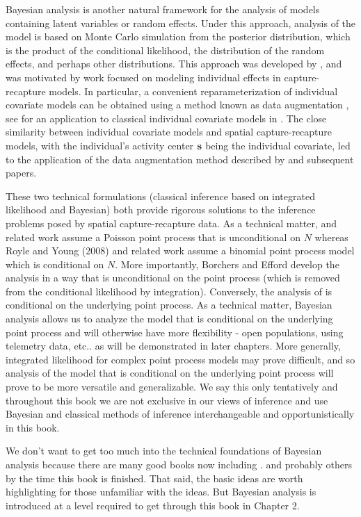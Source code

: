 Bayesian analysis is another natural framework for the analysis of
models containing latent variables or random effects.  Under this
approach, analysis of the model is based on Monte Carlo simulation
from the posterior distribution, which is the product of the
conditional likelihood, the distribution of the random effects, and
perhaps other distributions.  This approach was developed by
\citet{royle_young:2008}, and was motivated by work focused on
modeling individual effects in capture-recapture models. In
particular, a convenient reparameterization of individual covariate
models can be obtained using a method known as data augmentation
\citep{royle_etal:2007}, see \citet{royle:2008} for an application to
classical individual covariate models in \citet{royle:2008}. The close
similarity between individual covariate models and spatial
capture-recapture models, with the individual's activity center ${\bf
  s}$ being the individual covariate, led to the application of the
data augmentation method described by \citet{royle_young:2008} and subsequent papers. 

These two technical formulations (classical inference based on
integrated likelihood and Bayesian) both provide rigorous solutions to
the inference problems posed by spatial capture-recapture data.  As a
technical matter, \citet{borchers_efford:2008} and related work assume
a Poisson point process that is unconditional on $N$ whereas Royle and
Young (2008) and related work assume a binomial point process model
which is conditional on $N$.  More importantly, Borchers and Efford
develop the analysis in a way that is unconditional on the point
process (which is removed from the conditional likelihood by
integration).  Conversely, the analysis of \citet{royle_young:2008} is
conditional on the underlying point process. As a technical matter,
Bayesian analysis allows us to analyze the model that is conditional
on the underlying point process and will otherwise have more
flexibility - open populations, using telemetry data, etc.. as will be
demonstrated in later chapters.  More generally, integrated likelihood
for complex point process models may prove difficult, and so analysis
of the model that is conditional on the underlying point process will
prove to be more versatile and generalizable. We say this only
tentatively and throughout this book we are not exclusive in our views
of inference and use Bayesian and classical methods of inference
interchangeable and opportunistically in this book.

We don't want to get too much into the technical foundations of
Bayesian analysis because there are many good books now including
\citet{link_barker:2009}.  \citet{kery:2010, mccarthy:2007,
  king_etal:2009} and probably others by the time this book is
finished. That said, the basic ideas are worth highlighting for those
unfamiliar with the ideas.  But Bayesian analysis is introduced at a
level required to get through this book in Chapter 2.


